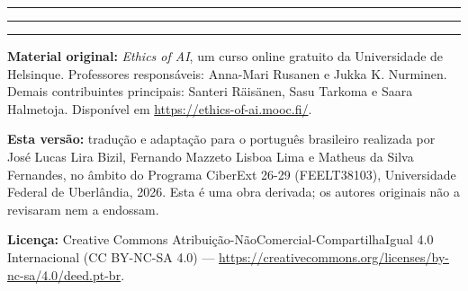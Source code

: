 \documentclass[
  11pt,
]{article}
\newcommand{\faixaEixos}[1][\linewidth]{%
  \noindent
  \textcolor{iaConceitos}{\rule{0.3333#1}{4pt}}%
  \textcolor{iaAplic}{\rule{0.3333#1}{4pt}}%
  \textcolor{iaRiscos}{\rule{0.3333#1}{4pt}}%
  \par}
\newenvironment{licenca}
  {\par\vspace{2em}\faixaEixos\par\vspace{0.8em}
   \begingroup\sffamily\scriptsize\color{iaTintaFraca}}
  {\endgroup\par}
\begin{document}
\begin{licenca}

\textbf{Material original:} \emph{Ethics of AI}, um curso online
gratuito da Universidade de Helsinque. Professores responsáveis:
Anna-Mari Rusanen e Jukka K. Nurminen. Demais contribuintes principais:
Santeri Räisänen, Sasu Tarkoma e Saara Halmetoja. Disponível em
\url{https://ethics-of-ai.mooc.fi/}.

\textbf{Esta versão:} tradução e adaptação para o português brasileiro
realizada por José Lucas Lira Bizil, Fernando Mazzeto Lisboa Lima e
Matheus da Silva Fernandes, no âmbito do Programa CiberExt 26-29
(FEELT38103), Universidade Federal de Uberlândia, 2026. Esta é uma obra
derivada; os autores originais não a revisaram nem a endossam.

\textbf{Licença:} Creative Commons
Atribuição-NãoComercial-CompartilhaIgual 4.0 Internacional (CC BY-NC-SA
4.0) ---
\url{https://creativecommons.org/licenses/by-nc-sa/4.0/deed.pt-br}.

\end{licenca}
\end{document}
